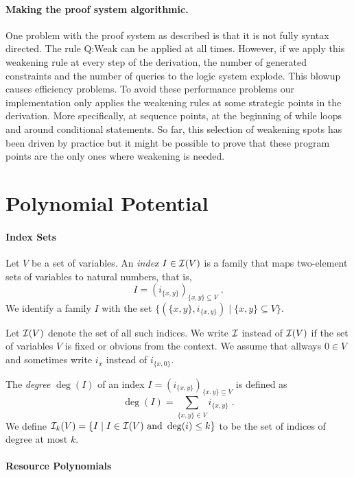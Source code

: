 \documentclass[nocopyrightspace,preprint]{sigplanconf}
\begin{document}
\paragraph{Making the proof system algorithmic.}
One problem with the proof system as described is that it is not
fully syntax directed.  The rule {\sc Q:Weak} can be applied at
all times.  However, if we apply this weakening rule at every step
of the derivation, the number of generated constraints and
the number of queries to the logic system explode.  This blowup
causes efficiency problems.  To avoid these performance problems
our implementation only applies the weakening rules at some
strategic points in the derivation.  More specifically, at sequence
points, at the beginning of while loops and around conditional
statements.  So far, this selection of weakening spots has been
driven by practice but it might be possible to prove that these
program points are the only ones where weakening is needed.


\section{Polynomial Potential}

\paragraph{Index Sets}

Let $V$ be a set of variables.  An \emph{index} $I \in \mathcal{I}(V)$ is a
family that maps two-element sets of variables to natural numbers,
that is,
$$
I = (i_{\{x,y\}})_{\{x,y\} \subseteq V} \; .
$$
%
We identify a family $I$ with the set $\{ (\{x,y\},i_{\{x,y\}})
\mid \{x,y\} \subseteq V\}$.

Let $\mathcal{I}(V)$ denote the set of all such indices.  We write $\mathcal{I}$
instead of $\mathcal{I}(V)$ if the set of variables $V$ is fixed or obvious
from the context.
%
We assume that allways $0 \in V$ and sometimes write $i_x$ instead of $i_{\{x,0\}}$.

The \emph{degree} $\deg(I)$ of an index $I = (i_{\{x,y\}})_{\{x,y\}
  \subseteq V}$ is defined as
$$
\deg(I) = \sum_{\{x,y\} \in V} i_{\{x,y\}} \;.
$$
We define $\mathcal{I}_k(V) = \{ I \mid I \in \mathcal{I}(V) \text{ and } \deg(i) \leq k
\}$ to be the set of indices of degree at most $k$.

\paragraph{Resource Polynomials}
\end{document}

